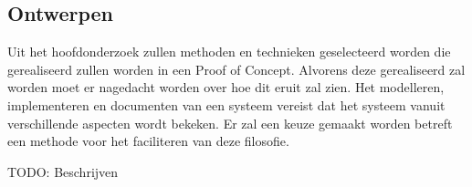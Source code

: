 \subsection{Ontwerpen}

Uit het hoofdonderzoek zullen methoden en technieken geselecteerd worden die gerealiseerd zullen worden in een Proof of Concept. Alvorens deze gerealiseerd zal worden moet er nagedacht worden over hoe dit eruit zal zien. Het modelleren, implementeren en documenten van een systeem vereist dat het systeem vanuit verschillende aspecten wordt bekeken. Er zal een keuze gemaakt worden betreft een methode voor het faciliteren van deze filosofie.

TODO: Beschrijven